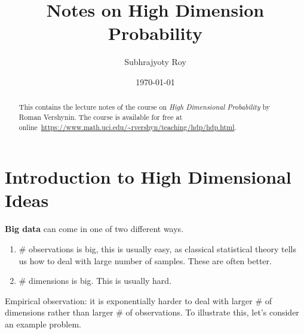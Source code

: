 \documentclass[12pt]{article}
\title{Notes on High Dimension Probability}
\author{Subhrajyoty Roy}
\date{\today}
\begin{document}
\allowdisplaybreaks
\maketitle

\begin{abstract}
    This contains the lecture notes of the course on \textit{High Dimensional Probability} by Roman Vershynin. The course is available for free at online~\url{https://www.math.uci.edu/~rvershyn/teaching/hdp/hdp.html}.
\end{abstract}

\tableofcontents


\section{Introduction to High Dimensional Ideas}

\textbf{Big data} can come in one of two different ways.
\begin{enumerate}
    \item \# observations is big, this is usually easy, as classical statistical theory tells us how to deal with large number of samples. These are often better.
    \item \# dimensions is big. This is usually hard.
\end{enumerate}

Empirical observation: it is exponentially harder to deal with larger \# of dimensions rather than larger \# of observations. To illustrate this, let's consider an example problem.
\end{document}
